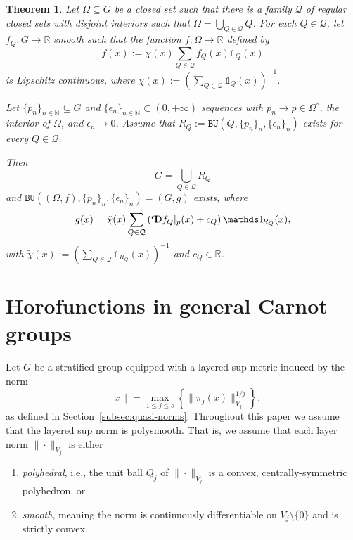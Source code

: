 \documentclass{article}
\newtheorem{theorem}{Theorem}[section]
\theoremstyle{definition}
\newcommand{\one}{{\mathds 1\!}}
\newcommand{\BU}{\mathtt{BU}}
\newcommand{\norm}[1]{\|#1\|}
\newcommand{\pD}{\text{\scalebox{-1}[1]{$\mathrm{P}$}\!\!$\mathrm{D}$}}
\newcommand{\N}{{\mathbb N}}
\newcommand{\R}{{\mathbb R}}
\begin{document}
\begin{theorem}{\cite[Theorem 3.9]{FNG}}\label{piecetogether}
	Let $\Omega\subseteq G$ be a closed set such that there is a family $\mathcal Q$ of regular closed sets  with disjoint interiors such that $\Omega=\bigcup_{Q\in\mathcal Q}  Q$.
	For each $Q\in\mathcal Q$, let $f_Q: G\to\R$ smooth such that the function $f:\Omega\to\R$ defined by
	\[
	f(x) := \chi(x) \sum_{Q\in\mathcal Q} f_Q(x) \one_{ Q}(x) 
	\]
	is Lipschitz continuous, where $\chi(x) := \left( \sum_{Q\in\mathcal Q} \one_{ Q}(x) \right)^{-1}$.
	
	Let $\{p_n\}_{n\in\N}\subseteq G$ and $\{\epsilon_n\}_{n\in\N}\subset(0,+\infty)$ sequences with $p_n\to p\in\Omega^\circ$, the interior of $\Omega$, and $\epsilon_n\to 0$.
	Assume that $R_Q:=\BU(Q,\{p_n\}_n,\{\epsilon_n\}_n)$ exists for every $Q\in\mathcal Q$.

	Then 
	\[
	 G = \bigcup_{Q\in\mathcal Q} R_Q
	\]
	and $\BU((\Omega,f),\{p_n\}_n,\{\epsilon_n\}_n) = ( G,g)$ exists, where
	\begin{equation}\label{eq03271750}
	g(x) = \tilde\chi(x) \sum_{Q\in\mathcal Q} \left( \pD f_Q|_p(x) + c_Q \right) \one_{R_Q}(x),
	\end{equation}
	with $\tilde\chi(x) := \left( \sum_{Q\in\mathcal Q} \one_{R_Q}(x) \right)^{-1}$
	and $c_Q\in\R$.
\end{theorem}










\section{Horofunctions in general Carnot groups}\label{section-general}

Let $G$ be a stratified group equipped with a layered sup metric induced by the norm
\[
\norm{x} = \max_{1\leq j \leq s} \left\{\norm{\pi_j(x)}_{V_j}^{1/j}\right \},
\]
as defined in Section~\ref{subsec:quasi-norms}. 
Throughout this paper we assume that the layered sup norm is polysmooth. That is, we assume that each layer norm $\norm{\cdot}_{V_j}$ is either
\begin{enumerate}
\item {\em polyhedral}, i.e., the unit ball $Q_j$ of $\norm{\cdot}_{V_j}$ is a convex, centrally-symmetric polyhedron, or
\item {\em smooth}, meaning the norm is continuously differentiable on $V_j \setminus \{0\}$ and is strictly convex.
\end{enumerate}
\end{document}
